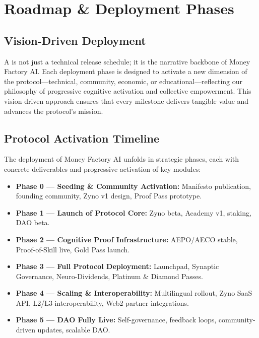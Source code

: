 
\section{Roadmap \& Deployment Phases}

\subsection{Vision-Driven Deployment}
A  is not just a technical release schedule; it is the narrative backbone of Money Factory AI. Each deployment phase is designed to activate a new dimension of the protocol—technical, community, economic, or educational—reflecting our philosophy of progressive cognitive activation and collective empowerment. This vision-driven approach ensures that every milestone delivers tangible value and advances the protocol’s mission.

\subsection{Protocol Activation Timeline}
The deployment of Money Factory AI unfolds in strategic phases, each with concrete deliverables and progressive activation of key modules:

\begin{itemize}
  \item \textbf{Phase 0 — Seeding \& Community Activation:} Manifesto publication, founding community, Zyno v1 design, Proof Pass prototype.
  \item \textbf{Phase 1 — Launch of Protocol Core:} Zyno beta, Academy v1, staking, DAO beta.
  \item \textbf{Phase 2 — Cognitive Proof Infrastructure:} AEPO/AECO stable, Proof-of-Skill\texttrademark{} live, Gold Pass launch.
  \item \textbf{Phase 3 — Full Protocol Deployment:} Launchpad, Synaptic Governance, Neuro-Dividends\texttrademark{}, Platinum \& Diamond Passes.
  \item \textbf{Phase 4 — Scaling \& Interoperability:} Multilingual rollout, Zyno SaaS API, L2/L3 interoperability, Web2 partner integrations.
  \item \textbf{Phase 5 — DAO Fully Live:} Self-governance, feedback loops, community-driven updates, scalable DAO.
\end{itemize}

